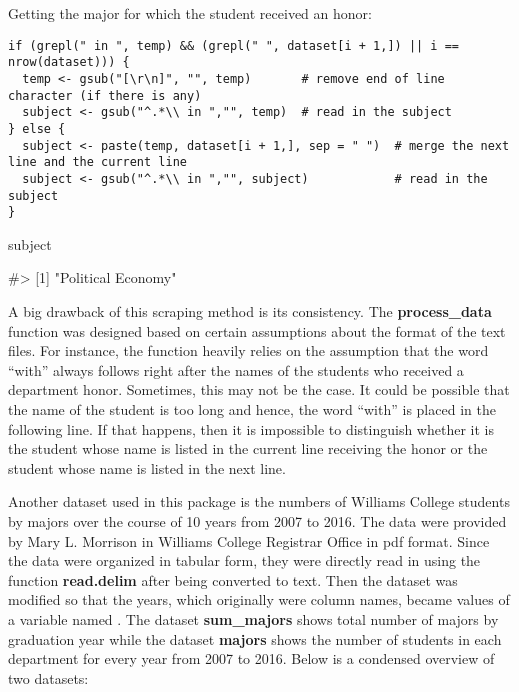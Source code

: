 Getting the major for which the student received an honor:

\begin{verbatim}
if (grepl(" in ", temp) && (grepl(" ", dataset[i + 1,]) || i == nrow(dataset))) {
  temp <- gsub("[\r\n]", "", temp)       # remove end of line character (if there is any)
  subject <- gsub("^.*\\ in ","", temp)  # read in the subject
} else {
  subject <- paste(temp, dataset[i + 1,], sep = " ")  # merge the next line and the current line
  subject <- gsub("^.*\\ in ","", subject)            # read in the subject
}
\end{verbatim}

\begin{Schunk}
\begin{Sinput}
subject
\end{Sinput}
\begin{Soutput}
#> [1] "Political Economy"
\end{Soutput}
\end{Schunk}

A big drawback of this scraping method is its consistency. The
\textbf{process\_data} function was designed based on certain
assumptions about the format of the text files. For instance, the
function heavily relies on the assumption that the word ``with'' always
follows right after the names of the students who received a department
honor. Sometimes, this may not be the case. It could be possible that
the name of the student is too long and hence, the word ``with'' is
placed in the following line. If that happens, then it is impossible to
distinguish whether it is the student whose name is listed in the
current line receiving the honor or the student whose name is listed in
the next line.

Another dataset used in this package is the numbers of Williams College
students by majors over the course of 10 years from 2007 to 2016. The
data were provided by Mary L. Morrison in Williams College Registrar
Office in pdf format. Since the data were organized in tabular form,
they were directly read in using the function \textbf{read.delim} after
being converted to text. Then the dataset was modified so that the
years, which originally were column names, became values of a variable
named . The dataset \textbf{sum\_majors} shows total number
of majors by graduation year while the dataset \textbf{majors} shows the
number of students in each department for every year from 2007 to 2016.
Below is a condensed overview of two datasets:

